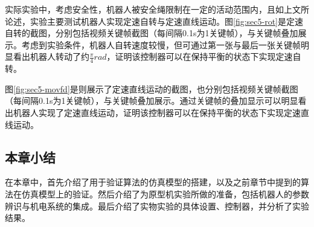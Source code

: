 实际实验中，考虑安全性，机器人被安全绳限制在一定的活动范围内，且如上文所论述，实验主要测试机器人实现定速自转与定速直线运动。图\ref{fig:sec5-rot}是定速自转的截图，分别包括视频关键帧截图（每间隔0.1s为1关键帧），与关键帧叠加展示。考虑到实验条件，机器人自转速度较慢，但可通过第一张与最后一张关键帧明显看出机器人转动了约$\frac{\pi}{4} rad$，证明该控制器可以在保持平衡的状态下实现定速自转。

图\ref{fig:sec5-movfd}是则展示了定速直线运动的截图，也分别包括视频关键帧截图（每间隔0.1s为1关键帧），与关键帧叠加展示。通过关键帧的叠加显示可以明显看出机器人实现了定速直线运动，证明该控制器可以在保持平衡的状态下实现定速直线运动。

\subsection{本章小结}

在本章中，首先介绍了用于验证算法的仿真模型的搭建，以及之前章节中提到的算法在仿真模型上的验证。然后介绍了为原型机实验所做的准备，包括机器人的参数辨识与机电系统的集成。最后介绍了实物实验的具体设置、控制器，并分析了实验结果。